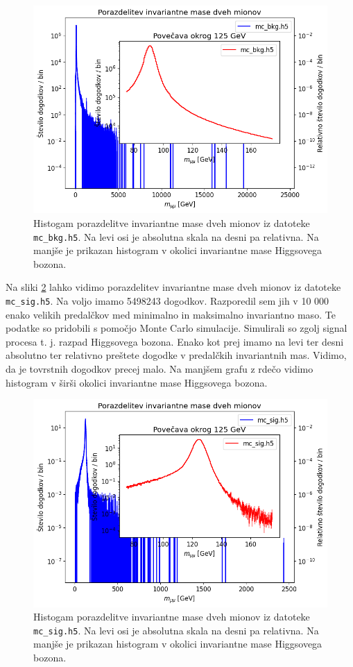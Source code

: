 \documentclass[slovene,11pt,a4paper]{article}
\begin{document}
\begin{figure}[h!]
    \centering
    \includegraphics[width=0.8\linewidth]{imgs/mc_bkg.png}
    \caption{Histogam porazdelitve invariantne mase dveh mionov iz datoteke \texttt{mc\_bkg.h5}.
    Na levi osi je absolutna skala na desni pa relativna. Na manjše je prikazan histogram v okolici
    invariantne mase Higgsovega bozona.}
    \label{fig:mc_bkg}
\end{figure}

Na sliki \ref{fig:mc_sig} lahko vidimo porazdelitev invariantne mase dveh mionov iz datoteke \texttt{mc\_sig.h5}. Na voljo imamo 5498243 dogodkov. Razporedil sem jih v 10 000 enako velikih predalčkov med minimalno in maksimalno invariantno maso. Te podatke so pridobili s pomočjo Monte Carlo simulacije. Simulirali so zgolj signal procesa t. j. razpad Higgsovega bozona. Enako kot prej imamo na levi ter desni absolutno ter relativno preštete dogodke v predalčkih invariantnih mas. Vidimo, da je tovrstnih dogodkov precej malo. Na manjšem grafu z rdečo vidimo histogram v širši okolici invariantne mase Higgsovega bozona.

\begin{figure}[h!]
    \centering
    \includegraphics[width=0.8\linewidth]{imgs/mc_sig.png}
    \caption{Histogam porazdelitve invariantne mase dveh mionov iz datoteke \texttt{mc\_sig.h5}.
    Na levi osi je absolutna skala na desni pa relativna. Na manjše je prikazan histogram v okolici
    invariantne mase Higgsovega bozona.}
    \label{fig:mc_sig}
\end{figure}
\end{document}
